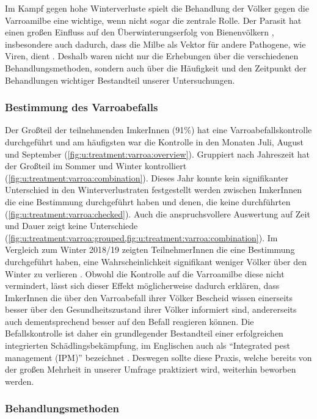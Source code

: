 Im Kampf gegen hohe Winterverluste spielt die Behandlung der Völker gegen die Varroamilbe eine wichtige, wenn nicht sogar die zentrale Rolle. Der Parasit hat einen großen Einfluss auf den Überwinterungserfolg von Bienenvölkern \citep{dahle2010}, insbesondere auch dadurch, dass die Milbe als Vektor für andere Pathogene, wie Viren, dient \citep{rosenkranz2010, noel2020}. Deshalb waren nicht nur die Erhebungen über die verschiedenen Behandlungsmethoden, sondern auch über die Häufigkeit und den Zeitpunkt der Behandlungen wichtiger Bestandteil unserer Untersuchungen.

\subsubsection{Bestimmung des Varroabefalls}

Der Großteil der teilnehmenden ImkerInnen (91\%) hat eine Varroabefalls\-kontrolle durchgeführt und am häufigsten war die Kontrolle in den Monaten Juli, August und September (\cref{fig:u:treatment:varroa:overview}). Gruppiert nach Jahreszeit hat der Großteil im Sommer und Winter kontrolliert (\cref{fig:u:treatment:varroa:combination}). Dieses Jahr konnte kein signifikanter Unterschied in den Winterverlustraten festgestellt werden zwischen ImkerInnen die eine Bestimmung durchgeführt haben und denen, die keine durchführten (\cref{fig:u:treatment:varroa:checked}). Auch die anspruchsvollere Auswertung auf Zeit und Dauer zeigt keine Unterschiede (\cref{fig:u:treatment:varroa:grouped,fig:u:treatment:varroa:combination}). Im Vergleich zum Winter 2018/19 zeigten TeilnehmerInnen die eine Bestimmung durchgeführt haben, eine Wahrscheinlichkeit signifikant weniger Völker über den Winter zu verlieren \citep{oberreiter2020}. Obwohl die Kontrolle auf die Varroamilbe diese nicht vermindert, lässt sich dieser Effekt möglicherweise dadurch erklären, dass ImkerInnen die über den Varroabefall ihrer Völker Bescheid wissen einerseits besser über den Gesundheitszustand ihrer Völker informiert sind, andererseits auch dementsprechend besser auf den Befall reagieren können. Die Befallskontrolle ist daher ein grundlegender Bestandteil einer erfolgreichen integrierten Schädlingsbekämpfung, im Englischen auch als \enquote{Integrated pest management (IPM)} bezeichnet \citep{roth2020}. Deswegen sollte diese Praxis, welche bereits von der großen Mehrheit in unserer Umfrage praktiziert wird, weiterhin beworben werden.

\subsubsection{Behandlungsmethoden}

